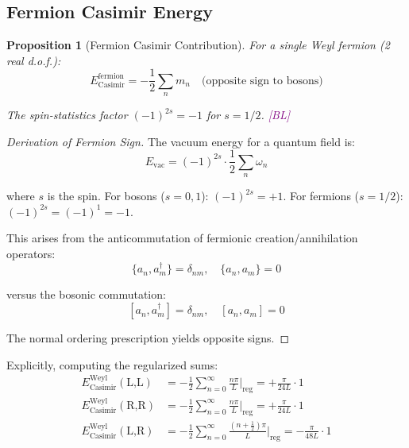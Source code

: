 \documentclass[11pt,a4paper]{article}
\newtheorem{proposition}[theorem]{Proposition}
\newcommand{\tagBL}{\textcolor{purple}{[BL]}}
\begin{document}
\subsection{Fermion Casimir Energy}

\begin{proposition}[Fermion Casimir Contribution]
\label{prop:ferm-casimir}
For a single Weyl fermion (2 real d.o.f.):
\begin{equation}
\label{eq:ferm-casimir-general}
E_{\text{Casimir}}^{\text{fermion}} = -\frac{1}{2} \sum_n m_n \quad \text{(opposite sign to bosons)}
\end{equation}

The spin-statistics factor $(-1)^{2s} = -1$ for $s = 1/2$. \tagBL
\end{proposition}

\begin{proof}[Derivation of Fermion Sign]
The vacuum energy for a quantum field is:
\begin{equation}
\label{eq:vac-energy-general}
E_{\text{vac}} = (-1)^{2s} \cdot \frac{1}{2} \sum_n \omega_n
\end{equation}

where $s$ is the spin. For bosons ($s = 0, 1$): $(-1)^{2s} = +1$.
For fermions ($s = 1/2$): $(-1)^{2s} = (-1)^1 = -1$.

This arises from the anticommutation of fermionic creation/annihilation operators:
\begin{equation}
\label{eq:ferm-anticomm}
\{a_n, a_m^\dagger\} = \delta_{nm}, \quad \{a_n, a_m\} = 0
\end{equation}

versus the bosonic commutation:
\begin{equation}
\label{eq:boson-comm}
[a_n, a_m^\dagger] = \delta_{nm}, \quad [a_n, a_m] = 0
\end{equation}

The normal ordering prescription yields opposite signs.
\end{proof}

Explicitly, computing the regularized sums:
\begin{align}
\label{eq:ferm-chi-LL}
E_{\text{Casimir}}^{\text{Weyl}}(\text{L,L}) &= -\frac{1}{2}\sum_{n=0}^\infty \frac{n\pi}{L}\bigg|_{\text{reg}} = +\frac{\pi}{24L} \cdot 1 \\
\label{eq:ferm-chi-RR}
E_{\text{Casimir}}^{\text{Weyl}}(\text{R,R}) &= -\frac{1}{2}\sum_{n=0}^\infty \frac{n\pi}{L}\bigg|_{\text{reg}} = +\frac{\pi}{24L} \cdot 1 \\
\label{eq:ferm-chi-LR}
E_{\text{Casimir}}^{\text{Weyl}}(\text{L,R}) &= -\frac{1}{2}\sum_{n=0}^\infty \frac{(n+\frac{1}{2})\pi}{L}\bigg|_{\text{reg}} = -\frac{\pi}{48L} \cdot 1
\end{align}
\end{document}
